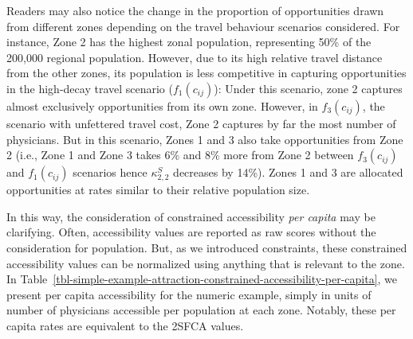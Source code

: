 \documentclass[
  10pt,
  letterpaper,
]{article}
\begin{document}
Readers may also notice the change in the proportion of opportunities
drawn from different zones depending on the travel behaviour scenarios
considered. For instance, Zone 2 has the highest zonal population,
representing 50\% of the 200,000 regional population. However, due to
its high relative travel distance from the other zones, its population
is less competitive in capturing opportunities in the high-decay travel
scenario (\(f_1(c_{ij})\)): Under this scenario, zone 2 captures almost
exclusively opportunities from its own zone. However, in
\(f_3(c_{ij})\), the scenario with unfettered travel cost, Zone 2
captures by far the most number of physicians. But in this scenario,
Zones 1 and 3 also take opportunities from Zone 2 (i.e., Zone 1 and Zone
3 takes 6\% and 8\% more from Zone 2 between \(f_3(c_{ij})\) and
\(f_1(c_{ij})\) scenarios hence \(\kappa_{2,2}^S\) decreases by 14\%).
Zones 1 and 3 are allocated opportunities at rates similar to their
relative population size.

In this way, the consideration of constrained accessibility \emph{per
capita} may be clarifying. Often, accessibility values are reported as
raw scores without the consideration for population. But, as we
introduced constraints, these constrained accessibility values can be
normalized using anything that is relevant to the zone. In
Table~\ref{tbl-simple-example-attraction-constrained-accessibility-per-capita},
we present per capita accessibility for the numeric example, simply in
units of number of physicians accessible per population at each zone.
Notably, these per capita rates are equivalent to the 2SFCA values.

\begin{table}

\caption{\label{tbl-simple-example-attraction-constrained-accessibility-per-capita}Simple
system: singly constrained accessible opportunities per capita.}


\end{table}%
\end{document}
